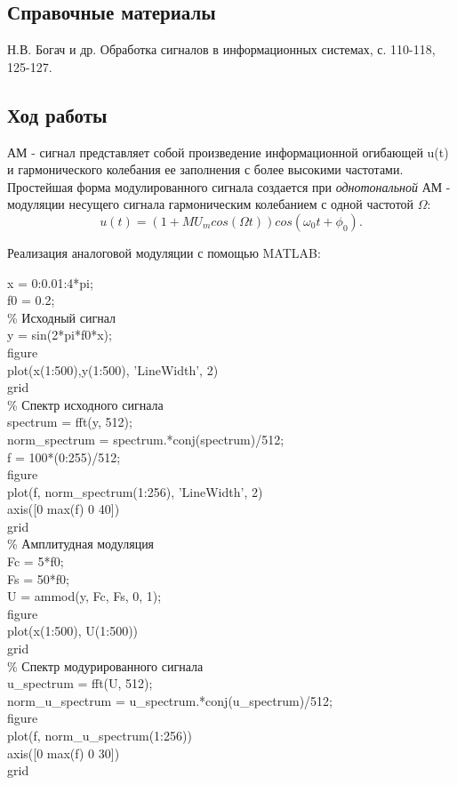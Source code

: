 \documentclass[10pt,a4paper]{article}
\begin{document}
\subsection{Справочные материалы}
Н.В. Богач и др. Обработка сигналов в информационных системах, с. 110-118, 125-127.

\subsection{Ход работы}
АМ - сигнал представляет собой произведение информационной огибающей u(t) и гармонического колебания ее заполнения с более высокими частотами. Простейшая форма модулированного сигнала создается при \textit{однотональной} АМ - модуляции несущего сигнала гармоническим колебанием с одной частотой $\Omega$:
	\begin{equation}
		u(t) = (1+MU_m cos(\Omega t))cos(\omega_0 t+\phi_0).
	\end{equation}

Реализация аналоговой модуляции с помощью MATLAB:
\begin{flushleft}
x = 0:0.01:4*pi;\\
f0 = 0.2;\\

\% Исходный сигнал\\
y = sin(2*pi*f0*x);\\
figure\\
plot(x(1:500),y(1:500), 'LineWidth', 2)\\
grid\\

\% Спектр исходного сигнала\\
spectrum = fft(y, 512);\\
norm\_spectrum = spectrum.*conj(spectrum)/512;\\
f = 100*(0:255)/512;\\
figure\\
plot(f, norm\_spectrum(1:256), 'LineWidth', 2)\\
axis([0 max(f) 0 40])\\
grid\\

\% Амплитудная модуляция\\
Fc = 5*f0;\\
Fs = 50*f0;\\
U = ammod(y, Fc, Fs, 0, 1);\\
figure \\
plot(x(1:500), U(1:500))\\
grid\\

\% Спектр модурированного сигнала\\
u\_spectrum = fft(U, 512);\\
norm\_u\_spectrum = u\_spectrum.*conj(u\_spectrum)/512;\\
figure\\
plot(f, norm\_u\_spectrum(1:256))\\
axis([0 max(f) 0 30])\\
grid\\
\end{flushleft}
\end{document}
